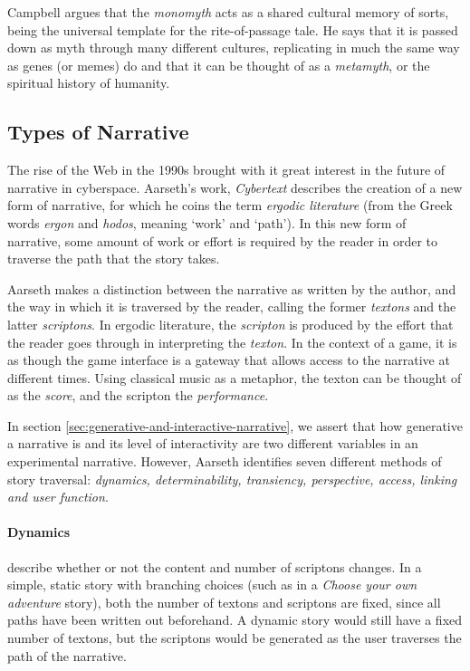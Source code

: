 Campbell argues that the \emph{monomyth} acts as a shared cultural memory of
sorts, being the universal template for the rite-of-passage tale. He says that
it is passed down as myth through many different cultures, replicating in much the same way
as genes (or memes) do and that it can be thought of as a \emph{metamyth}, or the
spiritual history of humanity.

\subsection{Types of Narrative}
The rise of the Web in the 1990s brought with it great interest in the future of narrative in cyberspace. Aarseth's work, \emph{Cybertext} \citep{aarseth1997cybertext} describes the creation of a new form of narrative, for which he coins the term \emph{ergodic literature} (from the Greek words \emph{ergon} and \emph{hodos}, meaning `work' and `path'). In this new form of narrative, some amount of work or effort is required by the reader in order to traverse the path that the story takes.

Aarseth makes a distinction between the narrative as written by the author, and the way in which it is traversed by the reader, calling the former \emph{textons} and the latter \emph{scriptons}. In ergodic literature, the \emph{scripton} is produced by the effort that the reader goes through in interpreting the \emph{texton}. In the context of a game, it is as though the game interface is a gateway that allows access to the narrative at different times. Using classical music as a metaphor, the texton can be thought of as the \emph{score}, and the scripton the \emph{performance}.

In section \ref{sec:generative-and-interactive-narrative}, we assert that how generative a narrative is and its level of interactivity are two different variables in an experimental narrative. However, Aarseth identifies seven different methods of story traversal: \emph{dynamics, determinability, transiency, perspective, access, linking and user function}.

\paragraph{Dynamics} describe whether or not the content and number of scriptons changes. In a simple, static story with branching choices (such as in a \emph{Choose your own adventure} story), both the number of textons and scriptons are fixed, since all paths have been written out beforehand. A dynamic story would still have a fixed number of textons, but the scriptons would be generated as the user traverses the path of the narrative.
